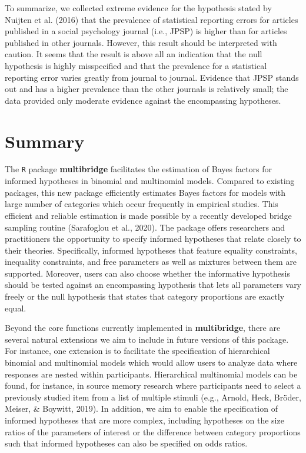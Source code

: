 \documentclass[
  english,
  man,floatsintext]{apa6}
\begin{document}
To summarize, we collected extreme evidence for the hypothesis stated by Nuijten et al. (2016) that the prevalence of statistical reporting errors for articles published in a social psychology journal (i.e., JPSP) is higher than for articles published in other journals. However, this result should be interpreted with caution. It seems that the result is above all an indication that the null hypothesis is highly misspecified and that the prevalence for a statistical reporting error varies greatly from journal to journal. Evidence that JPSP stands out and has a higher prevalence than the other journals is relatively small; the data provided only moderate evidence against the encompassing hypotheses.

\hypertarget{summary}{%
\section{Summary}\label{summary}}

The \texttt{R} package \textbf{multibridge} facilitates the estimation of Bayes factors for informed hypotheses in binomial and multinomial models. Compared to existing packages, this new package efficiently estimates Bayes factors for models with large number of categories which occur frequently in empirical studies. This efficient and reliable estimation is made possible by a recently developed bridge sampling routine (Sarafoglou et al., 2020). The package offers researchers and practitioners the opportunity to specify informed hypotheses that relate closely to their theories. Specifically, informed hypotheses that feature equality constraints, inequality constraints, and free parameters as well as mixtures between them are supported. Moreover, users can also choose whether the informative hypothesis should be tested against an encompassing hypothesis that lets all parameters vary freely or the null hypothesis that states that category proportions are exactly equal.

Beyond the core functions currently implemented in \textbf{multibridge}, there are several natural extensions we aim to include in future versions of this package. For instance, one extension is to facilitate the specification of hierarchical binomial and multinomial models which would allow users to analyze data where responses are nested within participants. Hierarchical multinomial models can be found, for instance, in source memory research where participants need to select a previously studied item from a list of multiple stimuli (e.g., Arnold, Heck, Bröder, Meiser, \& Boywitt, 2019). In addition, we aim to enable the specification of informed hypotheses that are more complex, including hypotheses on the size ratios of the parameters of interest or the difference between category proportions such that informed hypotheses can also be specified on odds ratios.
\end{document}
